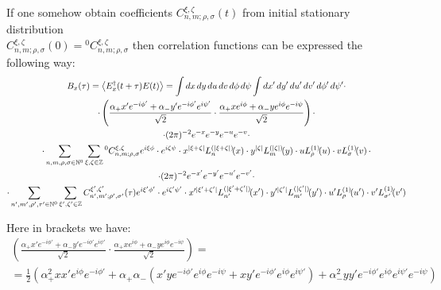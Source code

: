 \documentclass[12pt, notitlepage]{report}
\begin{document}
If one somehow obtain coefficients $C^{\xi, \zeta}_{n,m; \rho, \sigma}(t)$ from initial stationary distribution\\ $C^{\xi, \zeta}_{n,m; \rho, \sigma}(0) = {}^0C^{\xi, \zeta}_{n,m; \rho, \sigma}$ then correlation functions can be expressed the following way:
\begin{multline}
	B_x(\tau) = \left< E_x^\dagger(t+\tau) E(t) \right> = \int dx\, dy\, du\, dv\, d\phi\, d\psi \int dx'\, dy'\, du'\, dv'\, d\phi'\, d\psi' \cdot \\ \cdot \left( \frac{\alpha_+ x' e^{-i\phi'} + \alpha_- y' e^{-i\phi'}e^{i\psi'}}{\sqrt{2}} \cdot  \frac{\alpha_+ x e^{i\phi} + \alpha_- y e^{i\phi}e^{-i\psi}}{\sqrt{2}}  \right) \cdot \\
	\cdot (2\pi)^{-2} e^{-x}e^{-y}e^{-u}e^{-v} \cdot \\ \cdot \sum\limits_{n,m,\rho,\sigma\in \mathbb{N}^0}\sum\limits_{\xi,\zeta\in\mathbb{Z}} {}^0C^{\xi, \zeta}_{n,m; \rho, \sigma} e^{i\xi \phi} \cdot e^{i\zeta \psi} \cdot  x^{|\xi+\zeta|}\Lagg{n}{|\xi+\zeta|}{x} \cdot y^{|\zeta|}\Lagg{m}{|\zeta|}{y} \cdot
	u\Lagg{\rho}{1}{u} \cdot v\Lagg{\sigma}{1}{v} \cdot \\
	\cdot (2\pi)^{-2} e^{-x'}e^{-y'}e^{-u'}e^{-v'} \cdot \\ \cdot \sum\limits_{n',m',\rho',\tau'\in \mathbb{N}^0}\sum\limits_{\xi',\zeta'\in\mathbb{Z}} C^{\xi', \zeta'}_{n',m'; \rho', \sigma'}(\tau) e^{i\xi' \phi'} \cdot e^{i\zeta' \psi'} \cdot  x'^{|\xi'+\zeta'|}\Lagg{n'}{|\xi'+\zeta'|}{x'} \cdot y'^{|\zeta'|}\Lagg{m'}{|\zeta'|}{y'} \cdot
	u'\Lagg{\rho}{1}{u'} \cdot v'\Lagg{\sigma'}{1}{v'}
\end{multline}

Here in brackets we have:
\begin{multline}
	\left( \frac{\alpha_+ x' e^{-i\phi'} + \alpha_- y' e^{-i\phi'}e^{i\psi'}}{\sqrt{2}} \cdot  \frac{\alpha_+ x e^{i\phi} + \alpha_- y e^{i\phi}e^{-i\psi}}{\sqrt{2}}  \right) =\\= \frac{1}{2}\left( \alpha_+^2 x x' e^{i\phi} e^{-i\phi'} + \alpha_+\alpha_- (x'y e^{-i\phi'} e^{i\phi} e^{-i\psi} + xy' e^{-i\phi'} e^{i\phi} e^{i\psi'}) + \alpha_-^2 yy'e^{-i\phi'} e^{i\phi} e^{i\psi'}e^{-i\psi} \right)
\end{multline}
\end{document}
